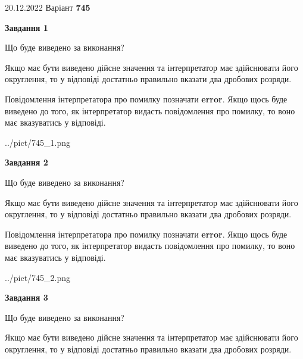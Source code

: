 \documentclass[12pt, ukrainian]{article}
\begin{document}
{20.12.2022 Варіант \No \textbf { 745 }\par}
{
\begin {Large}

{\begin {center}\textbf{Завдання 1}\end {center}}\par
Що буде виведено за виконання? \par

Якщо має бути виведено дійсне значення та інтерпретатор має здійснювати його округлення, 
то у відповіді достатньо правильно вказати два дробових розряди.

Повідомлення інтерпретатора про помилку позначати \textbf{error}.
Якщо щось буде виведено до того, як інтерпретатор видасть повідомлення про помилку, 
то воно має вказуватись у відповіді. \par

\begin{center}
	{../pict/745_1.png}
\end{center}
\newpage

{\begin {center}\textbf{Завдання 2}\end {center}}\par
Що буде виведено за виконання? \par

Якщо має бути виведено дійсне значення та інтерпретатор має здійснювати його округлення, 
то у відповіді достатньо правильно вказати два дробових розряди.

Повідомлення інтерпретатора про помилку позначати \textbf{error}.
Якщо щось буде виведено до того, як інтерпретатор видасть повідомлення про помилку, 
то воно має вказуватись у відповіді. \par

\begin{center}
	{../pict/745_2.png}
\end{center}
\newpage

{\begin {center}\textbf{Завдання 3}\end {center}}\par
Що буде виведено за виконання? \par

Якщо має бути виведено дійсне значення та інтерпретатор має здійснювати його округлення, 
то у відповіді достатньо правильно вказати два дробових розряди.


\end{Large}}
\end{document}
